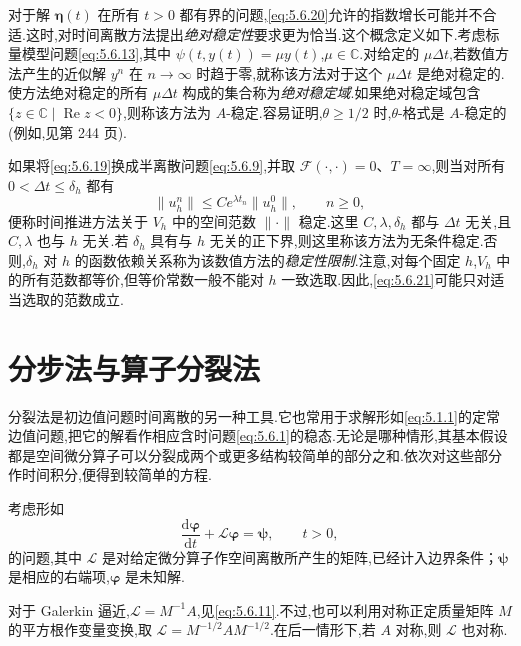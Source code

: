 对于解 \(\boldsymbol{\eta}(t)\) 在所有 \(t>0\) 都有界的问题,\eqref{eq:5.6.20}允许的指数增长可能并不合适.这时,对时间离散方法提出\emph{绝对稳定性}要求更为恰当.这个概念定义如下.考虑标量模型问题\eqref{eq:5.6.13},其中 \(\psi(t,y(t))=\mu y(t)\),\(\mu\in\mathbb C\).对给定的 \(\mu\Delta t\),若数值方法产生的近似解 \(y^n\) 在 \(n\to\infty\) 时趋于零,就称该方法对于这个 \(\mu\Delta t\) 是绝对稳定的.使方法绝对稳定的所有 \(\mu\Delta t\) 构成的集合称为\emph{绝对稳定域}.如果绝对稳定域包含 \(\{z\in\mathbb C\mid\operatorname{Re}z<0\}\),则称该方法为 \(A\)-稳定.容易证明,\(\theta\ge1/2\) 时,\(\theta\)-格式是 \(A\)-稳定的(例如,见第 244 页).

如果将\eqref{eq:5.6.19}换成半离散问题\eqref{eq:5.6.9},并取 \(\mathcal F(\cdot,\cdot)=0\)、\(T=\infty\),则当对所有 \(0<\Delta t\le\delta_h\) 都有
\begin{equation}\label{eq:5.6.21}
  \|u_h^n\|\le Ce^{\lambda t_n}\|u_h^0\|,\qquad n\ge0,
\end{equation}
便称时间推进方法关于 \(V_h\) 中的空间范数 \(\|\cdot\|\) 稳定.这里 \(C,\lambda,\delta_h\) 都与 \(\Delta t\) 无关,且 \(C,\lambda\) 也与 \(h\) 无关.若 \(\delta_h\) 具有与 \(h\) 无关的正下界,则这里称该方法为无条件稳定.否则,\(\delta_h\) 对 \(h\) 的函数依赖关系称为该数值方法的\emph{稳定性限制}.注意,对每个固定 \(h\),\(V_h\) 中的所有范数都等价,但等价常数一般不能对 \(h\) 一致选取.因此,\eqref{eq:5.6.21}可能只对适当选取的范数成立.

\section{分步法与算子分裂法}\label{sec:5.7}

分裂法是初边值问题时间离散的另一种工具.它也常用于求解形如\eqref{eq:5.1.1}的定常边值问题,把它的解看作相应含时问题\eqref{eq:5.6.1}的稳态.无论是哪种情形,其基本假设都是空间微分算子可以分裂成两个或更多结构较简单的部分之和.依次对这些部分作时间积分,便得到较简单的方程.

考虑形如
\begin{equation}\label{eq:5.7.1}
  \frac{\mathrm d\boldsymbol{\varphi}}{\mathrm dt}
    +\mathcal L\boldsymbol{\varphi}=\boldsymbol{\psi},\qquad t>0,
\end{equation}
的问题,其中 \(\mathcal L\) 是对给定微分算子作空间离散所产生的矩阵,已经计入边界条件；\(\boldsymbol{\psi}\) 是相应的右端项,\(\boldsymbol{\varphi}\) 是未知解.

对于 Galerkin 逼近,\(\mathcal L=M^{-1}A\),见\eqref{eq:5.6.11}.不过,也可以利用对称正定质量矩阵 \(M\) 的平方根作变量变换,取 \(\mathcal L=M^{-1/2}AM^{-1/2}\).在后一情形下,若 \(A\) 对称,则 \(\mathcal L\) 也对称.

